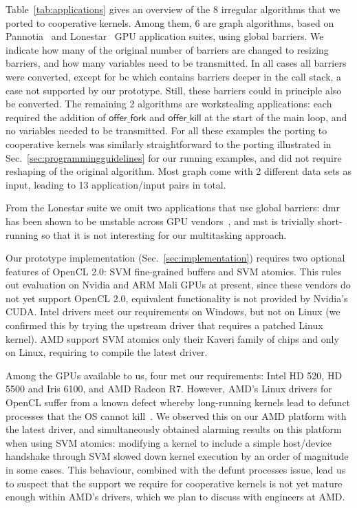 \documentclass[numbers,nocopyrightspace,10pt]{sigplanconf}
\newcommand{\mytablong}{Table~}
\newcommand{\mysec}{Sec.~}
\newcommand{\nvidia}{Nvidia\xspace}
\newcommand{\offerfork}{\mathsf{offer\_fork}}
\newcommand{\offerkill}{\mathsf{offer\_kill}}
\begin{document}
\mytablong\ref{tab:applications} gives an overview of the 8 irregular
algorithms that we ported to cooperative kernels. Among them, 6 are
graph algorithms, based on Pannotia~\cite{Pannotia} and
Lonestar~\cite{BNP12} GPU application suites, using global barriers.  We
indicate how many of the original number of barriers are changed to
resizing barriers, and how many variables need to be transmitted.  In
all cases all barriers were converted, except for bc which contains
barriers deeper in the call stack, a case not supported by our
prototype. Still, these barriers could in principle also be
converted. The remaining 2 algorithms are workstealing applications:
each required the addition of $\offerfork$ and $\offerkill$ at the start
of the main loop, and no variables needed to be transmitted.  For all
these examples the porting to cooperative kernels was similarly
straightforward to the porting illustrated in
\mysec\ref{sec:programmingguidelines} for our running examples, and did
not require reshaping of the original algorithm. Most graph come with 2
different data sets as input, leading to 13 application/input pairs in
total.

From the Lonestar suite we omit two applications that use global barriers:
dmr has been shown to be unstable across GPU vendors~\cite{DBLP:conf/iwocl/SorensenD16}, and mst is trivially short-running so that it is not
interesting for our multitasking approach.

Our prototype implementation (\mysec\ref{sec:implementation}) requires
two optional features of OpenCL 2.0: SVM fine-grained buffers and SVM
atomics. This rules out evaluation on \nvidia and ARM Mali GPUs at
present, since these vendors do not yet support OpenCL $2.0$,
equivalent functionality is not provided by \nvidia's CUDA. Intel
drivers meet our requirements on Windows, but not on Linux (we
confirmed this by trying the upstream driver that requires a patched
Linux kernel). AMD support SVM atomics only their Kaveri family of
chips and only on Linux, requiring to compile the latest driver.

Among the GPUs available to us, four met our requirements: Intel HD 520,
HD 5500 and Iris 6100, and AMD Radeon R7.  However, AMD's Linux drivers
for OpenCL suffer from a known defect whereby long-running kernels lead
to defunct processes that the OS cannot
kill~\cite{amd-defunct-process}. We observed this on our AMD platform
with the latest driver, and simultaneously obtained alarming results on
this platform when using SVM atomics: modifying a kernel to include a
simple host/device handshake through SVM slowed down kernel execution by
an order of magnitude in some cases.  This behaviour, combined with the
defunt processes issue, lead us to suspect that the support we require
for cooperative kernels is not yet mature enough within AMD's drivers,
which we plan to discuss with engineers at AMD.
\end{document}
